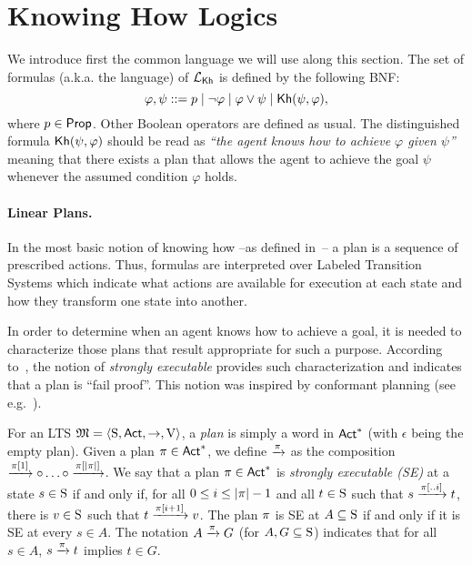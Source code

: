 \section{Knowing How Logics}
\label{sec:khlinearplans}

We introduce first the common language we will use along this section. 
The set of formulas (a.k.a. the language) of $\Khlogic$ is defined by the following BNF:
\[
  \varphi, \psi ::= p \mid \neg \varphi \mid \varphi \vee \psi \mid \kh(\psi,\varphi),
\]
%
where $p\in\Prop$. Other Boolean operators are defined as usual. 
%
The distinguished formula $\kh(\psi,\varphi)$ should be read as \emph{``the agent knows how to achieve $\varphi$ given $\psi$''} meaning that there exists a plan that allows the agent to achieve the goal $\psi$ whenever the assumed condition $\varphi$ holds.

\paragraph{Linear Plans.} 
In the most basic notion of knowing how --as defined in~\cite{Wang15lori,Wang16,Wang2016}-- a plan is a sequence of prescribed actions.
%
Thus, formulas are interpreted over Labeled Transition Systems which indicate what actions are available for execution at each state and how they transform one state into another.

In order to determine when an agent knows how to achieve a goal, it is needed to characterize those %
plans that result appropriate for such a purpose.  According to~\cite{Wang15lori}, the notion of \emph{strongly executable} provides such characterization and indicates that a plan is ``fail proof''. This notion was inspired by conformant planning (see e.g.~\cite{CimattiRT98}).

For an LTS $\model=\tup{\S,\Act,\ra,\V}$, a \emph{plan} is simply a word in $\Act^*$ (with $\epsilon$ being the empty plan).  
%
Given a plan $\plan\in\Act^*$, we define $\reach{\plan}$ as the composition $\reach{\plan[1]} \comp \ldots \comp \reach{\plan[\size{\plan}]}$. 
%
We say that a plan $\plan\in\Act^*$ is \emph{strongly executable (SE)} at a state $s\in\S$ if and only if, for all $0\leq i \leq \size{\plan}-1$ and all $t\in\S$ such that $s\reach{\plan[..i]} t$, there is $v\in\S$ such that $t\reach{\plan[i+1]} v$. The plan $\plan$ is SE at $A\subseteq \S$ if and only if it is SE at every $s\in A$. The notation $A \reach{\plan} G$ (for $A,G\subseteq\S$) indicates that for all $s\in A$,  $s\reach{\plan} t$ implies $t\in G$.

